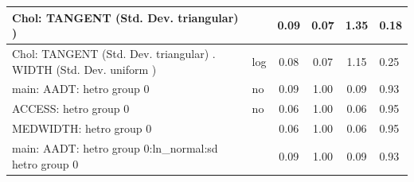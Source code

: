 \begin{table}
\begin{center}
\begin{tabular}{|l|l|c|c|c|l|}
			\hline
			 Chol: TANGENT (Std. Dev. triangular) ) &  & 0.09 & 0.07 & 1.35 & 0.18 \\
			\hline
			 Chol: TANGENT (Std. Dev. triangular) . WIDTH (Std. Dev.   uniform ) & log & 0.08 & 0.07 & 1.15 & 0.25 \\
			\hline
			main: AADT: hetro group 0 & no & 0.09 & 1.00 & 0.09 & 0.93 \\
			\hline
			ACCESS: hetro group 0 & no & 0.06 & 1.00 & 0.06 & 0.95 \\
			\hline
			MEDWIDTH: hetro group 0 &  & 0.06 & 1.00 & 0.06 & 0.95 \\
			\hline
			main: AADT: hetro group 0:ln_normal:sd  hetro group 0 &  & 0.09 & 1.00 & 0.09 & 0.93 \\
			\hline
		\end{tabular}
	\end{center}
\end{table}